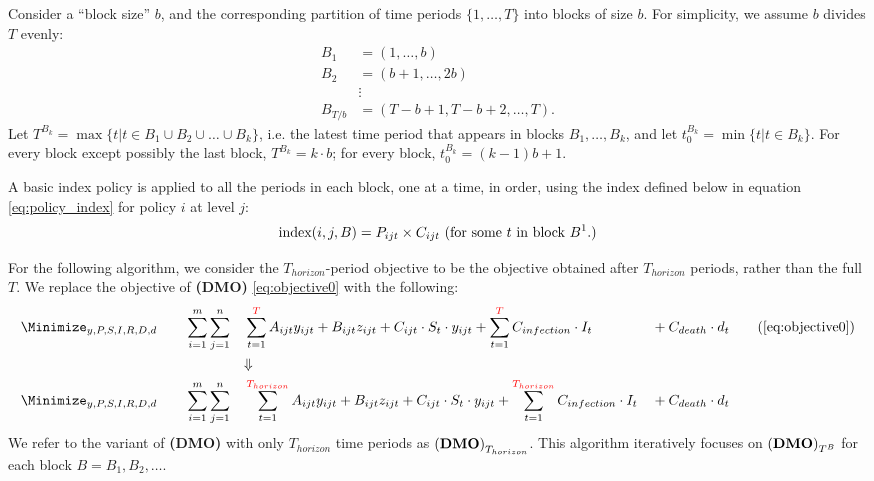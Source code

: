 \documentclass{article}
\newcommand{\model}{{\bf (DMO) }}
\begin{document}
Consider a ``block size'' $b$, and the corresponding partition of time periods $\{1,\ldots,T\}$ into blocks of size $b$. For simplicity, we assume $b$ divides $T$ evenly:
\begin{align*}
    B_1    &= (1,\ldots,b)\\
    B_2    &= (b+1,\ldots,2b)\\
            &\vdots\\
    B_{T/b} &= (T-b+1, T-b+2,\ldots,T).
\end{align*}
Let $T^{B_k} = \max\{t | t \in B_1 \cup B_2 \cup \ldots \cup B_k\}$, i.e. the latest time period that appears in blocks $B_1,\ldots,B_k$, and let $t_0^{B_k} = \min\{t | t \in B_k\}$. For every block except possibly the last block, $T^{B_k} = k\cdot b$; for every block, $t_0^{B_k} = (k-1)b +1$.

A basic index policy is applied to all the periods in each block, one at a time, in order, using the index defined below in equation \eqref{eq:policy_index} for policy $i$ at level $j$:
\begin{equation}\label{eq:policy_index}
    \text{index}(i,j,B) = P_{ijt} \times C_{ijt} \text{ (for some $t$ in block $B$\footnotemark.)}
\end{equation}

For the following algorithm, we consider the $T_{horizon}$-period objective to be the objective obtained after $T_{horizon}$ periods, rather than the full $T$. We replace the objective of \model \eqref{eq:objective0} with the following:
\begin{alignat}{3}
   & \Minimize_{y,P,S,I,R,D,d}\qquad \sum_{i=1}^{m}\sum_{j=1}^{n}&&\sum_{t=1}^{{\color{red}T}}A_{ijt}y_{ijt} + B_{ijt}z_{ijt}+ C_{ijt}\cdot S_{t} \cdot y_{ijt}+ \sum_{t=1}^{{\color{red}T}}C_{infection}\cdot I_t &&+ C_{death} \cdot d_t \tag{\ref{eq:objective0}}\\
   & &&\mathbf{\Downarrow}\nonumber\\
   & \Minimize_{y,P,S,I,R,D,d}\qquad \sum_{i=1}^{m}\sum_{j=1}^{n}&&\sum_{t=1}^{{\color{red}T_{horizon}}}A_{ijt}y_{ijt} + B_{ijt}z_{ijt} + C_{ijt}\cdot S_{t} \cdot y_{ijt}+ \sum_{t=1}^{{\color{red}T_{horizon}}}C_{infection}\cdot I_t &&+ C_{death} \cdot d_t  \label{eq:obj_horizon}
\end{alignat}
We refer to the variant of \model with only $T_{horizon}$ time periods as ${\model}_{T_{horizon}}$. This algorithm iteratively focuses on $\model_{T^B}$ for each block $B=B_1,B_2,\ldots$.
\end{document}
